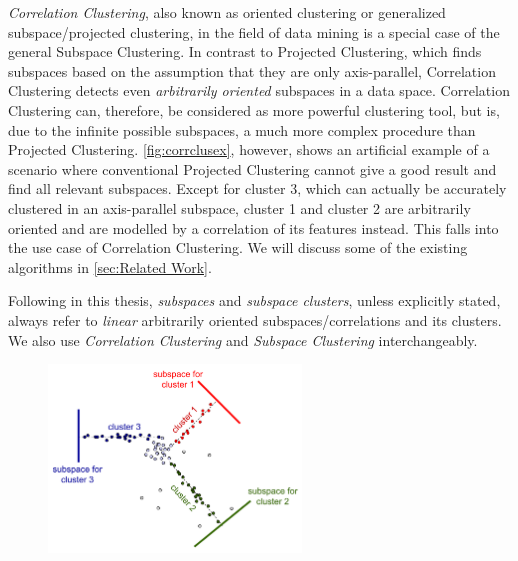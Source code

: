 \textit{Correlation Clustering}, also known as oriented clustering or generalized subspace/projected clustering, in the field of data mining is a special case of the general Subspace Clustering. In contrast to Projected Clustering, which finds subspaces based on the assumption that they are only axis-parallel, Correlation Clustering detects even \textit{arbitrarily oriented} subspaces in a data space. Correlation Clustering can, therefore, be considered as more powerful clustering tool, but is, due to the infinite possible subspaces, a much more complex procedure than Projected Clustering. \autoref{fig:corrclusex}, however, shows an artificial example of a scenario where conventional Projected Clustering cannot give a good result and find all relevant subspaces. Except for cluster 3, which can actually be accurately clustered in an axis-parallel subspace, cluster 1 and cluster 2 are arbitrarily oriented and are modelled by a correlation of its features instead. This falls into the use case of Correlation Clustering. We will discuss some of the existing algorithms in \autoref{sec:Related Work}.


Following in this thesis, \textit{subspaces} and \textit{subspace clusters}, unless explicitly stated, always refer to \textit{linear} arbitrarily oriented subspaces/correlations and its clusters. We also use \textit{Correlation Clustering} and \textit{Subspace Clustering} interchangeably.
\begin{figure}
    \centering
    \includegraphics[width=0.6\textwidth]{figures/subcluex.png}
    \caption{\cite[20]{zimek2009correlation}}
    \label{fig:corrclusex}
\end{figure}